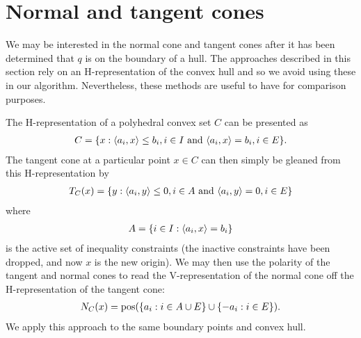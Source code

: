 \section{Normal and tangent cones} \label{S:ncone tcone}
We may be interested in the normal cone and tangent cones after it has been
determined that $q$ is on the boundary of a  hull.  The approaches described
in this section rely on an H-representation of the convex hull and so we avoid 
using these in our algorithm.  Nevertheless, these methods are useful to have for
comparison purposes.

The H-representation of a polyhedral convex set $C$ can be presented as
\begin{align*}
	C = \{ x: \langle a_i, x \rangle \leq b_i, i \in I \text{ and } 
				\langle a_i, x \rangle = b_i, i \in E \}.
\end{align*}
The tangent cone at a particular point $x \in C$ can then simply be gleaned from 
this H-representation by
\begin{align*}
	T_C(x) = \{ y: \langle a_i, y \rangle \leq 0, i \in A \text{ and } 
				\langle a_i, y \rangle = 0, i \in E \}
\end{align*}
where 
\begin{align*}
	A = \{ i \in I: \langle a_i, x \rangle = b_i \}
\end{align*}
is the active set of inequality constraints (the inactive constraints have been
 dropped, and now $x$ is the new origin).
We may then use the polarity of the tangent and normal cones to read the 
V-representation of the normal cone off the H-representation 
of the tangent cone:
\begin{align*}
	N_C(x) = \operatorname{pos}( \{ a_i: i \in A \cup E \} \cup \{ -a_i: i \in E \} ).
\end{align*}
We apply this approach to the same boundary points and convex hull.

